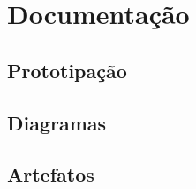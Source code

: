 \chapter{Documentação}
\label{apendice}
\clearpage

\section{Prototipação}
\label{prototipacao}

\clearpage

\section{Diagramas}
\label{diagramas}

\clearpage

\section{Artefatos}
\label{artefatos}


% 